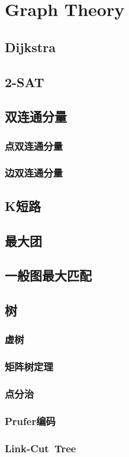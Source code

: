 \chapter{Graph Theory}
\section{Dijkstra}
\section{2-SAT}
\section{双连通分量}
\subsection{点双连通分量}
\subsection{边双连通分量}
\section{K短路}
\section{最大团}
\section{一般图最大匹配}
\section{树}
\subsection{虚树}
\subsection{矩阵树定理}
\subsection{点分治}
\subsection{Prufer编码}
\subsection{Link-Cut\ Tree}
